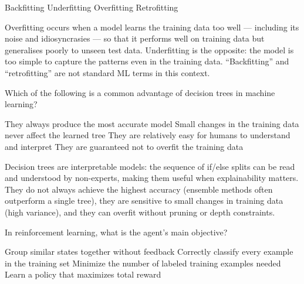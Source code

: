 \documentclass[answers]{exam}
\begin{document}
\begin{questions}
\begin{oneparchoices}
    \choice Backfitting
    \choice Underfitting
    \correctchoice Overfitting
    \choice Retrofitting
\end{oneparchoices}

\begin{solution}
    Overfitting occurs when a model learns the training data too well --- including its noise and idiosyncrasies --- so that it performs well on training data but generalises poorly to unseen test data.
    Underfitting is the opposite: the model is too simple to capture the patterns even in the training data.
    ``Backfitting'' and ``retrofitting'' are not standard ML terms in this context.
\end{solution}

\question Which of the following is a common advantage of decision trees in machine learning?

\begin{choices}
    \choice They always produce the most accurate model
    \choice Small changes in the training data never affect the learned tree
    \correctchoice They are relatively easy for humans to understand and interpret
    \choice They are guaranteed not to overfit the training data
\end{choices}

\begin{solution}
    Decision trees are interpretable models: the sequence of if/else splits can be read and understood by non-experts, making them useful when explainability matters.
    They do not always achieve the highest accuracy (ensemble methods often outperform a single tree), they are sensitive to small changes in training data (high variance), and they can overfit without pruning or depth constraints.
\end{solution}

\question In reinforcement learning, what is the agent's main objective?

\begin{choices}
    \choice Group similar states together without feedback
    \choice Correctly classify every example in the training set
    \choice Minimize the number of labeled training examples needed
    \correctchoice Learn a policy that maximizes total reward
\end{choices}


\end{questions}
\end{document}
